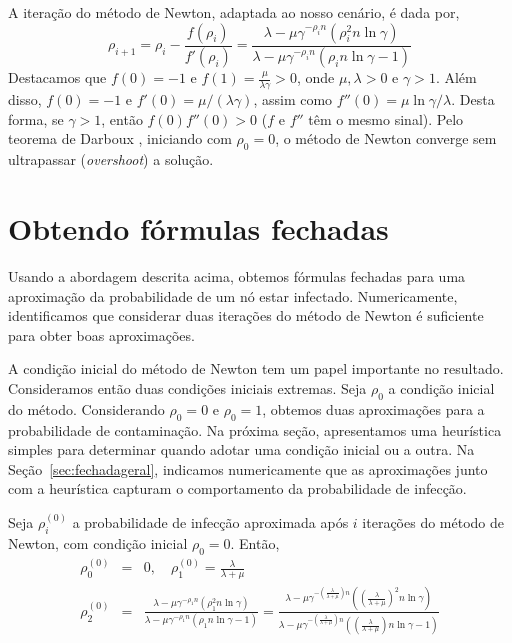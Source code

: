 	    A iteração  do método de Newton, adaptada ao nosso cenário, é dada por,
	    \begin{equation}
	        \rho_{i+1} =  \rho_{i} - \frac{f(\rho_{i})}{f'(\rho_{i})} = \frac{\lambda-\mu\gamma^{-\rho_{i}n} \left(\rho_{i}^{2} n\ln\gamma\right)}{\lambda-\mu \gamma^{-\rho_{i}n} \left(\rho_{i}n \ln\gamma-1\right)} \label{eq:newton_general}
	    \end{equation}
	    Destacamos que $f(0)=-1$ e $f(1) = \frac{\mu}{\lambda \gamma} > 0$, onde $ \mu, \lambda > 0$ e $\gamma > 1$.  Além disso, $f(0)=-1$ e $ f'(0) =  {\mu}/({\lambda \gamma})$, assim como $ f''(0) = {\mu \ln \gamma}/{\lambda}$.  Desta forma, se $\gamma > 1$, então $f(0)  f''(0) > 0$ ($f$ e $f''$ têm o mesmo sinal). Pelo teorema  de  Darboux \cite{mikusinski1955methode}, iniciando com  $\rho_0 = 0$, o método de Newton converge sem  ultrapassar (\emph{overshoot}) a solução.


	\section{Obtendo fórmulas fechadas}
	\label{sec:fechada}
		Usando a abordagem descrita acima, obtemos  fórmulas fechadas para uma aproximação da probabilidade de um nó estar infectado.  Numericamente, identificamos que considerar  duas iterações do método de Newton é suficiente para obter boas aproximações.

		A condição inicial do método de Newton tem um papel importante no resultado.  Consideramos então duas condições iniciais extremas. Seja $\rho_0$ a condição inicial do método.  Considerando $\rho_0=0$ e $\rho_0=1$, obtemos duas aproximações para a probabilidade de contaminação.  Na próxima seção, apresentamos uma heurística simples para determinar quando adotar uma condição inicial ou a outra.  Na Seção~\ref{sec:fechadageral}, indicamos numericamente que as aproximações junto com a heurística capturam o comportamento da probabilidade de infecção.

		Seja $\rho_i^{(0)}$ a probabilidade de infecção aproximada após $i$ iterações do método de Newton, com condição inicial $\rho_0=0$. Então, 
			 \begin{eqnarray}
			  \rho_{0}^{(0)} &=& 0, \quad \rho_1^{(0)} = \frac{\lambda}{\lambda + \mu}   \nonumber \\
			  \rho_{2}^{(0)} &=& \frac{ \lambda - \mu \gamma^{-\rho_{1} n }  \left( \rho_{1}^{2} n  \ln \gamma    \right) }  
		                            { \lambda - \mu \gamma^{-\rho_{1} n }  \left( \rho_{1}     n  \ln \gamma  -1 \right) } \nonumber =  \frac{ \lambda - \mu \gamma^{-\left( \frac{\lambda}{\lambda + \mu} \right) n }  \left( \left( \frac{\lambda}{\lambda + \mu} \right)^{2} n  \ln \gamma    \right) }  
		                            { \lambda - \mu \gamma^{-\left( \frac{\lambda}{\lambda + \mu} \right) n }  \left( \left( \frac{\lambda}{\lambda + \mu} \right)     n  \ln \gamma  -1 \right) } \label{eq:rho_2iter_rho0_0}
			 \end{eqnarray}

